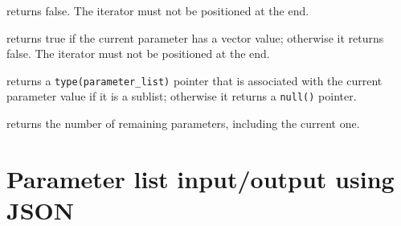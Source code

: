\documentclass[11pt]{article}
\begin{document}
\begin{description}[style=nextline]
  returns false.  The iterator must not be positioned at the end.
\item[\texttt{is_vector()}]
  returns true if the current parameter has a vector value; otherwise it
  returns false.  The iterator must not be positioned at the end.
\item[\texttt{sublist()}]
  returns a \texttt{type(parameter_list)} pointer that is associated with
  the current parameter value if it is a sublist; otherwise it returns a
  \texttt{null()} pointer.
\item[\texttt{count()}]
  returns the number of remaining parameters, including the current one.
\end{description}

\section{Parameter list input/output using JSON}
\end{document}
